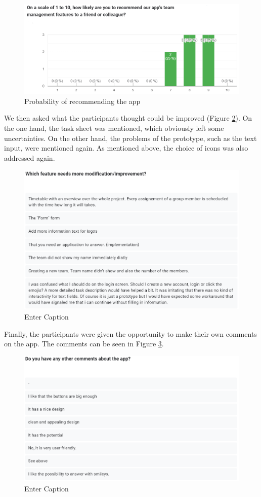 \documentclass[11pt]{article}
\begin{document}
\begin{figure}[h!]
    \centering
    \includegraphics[width=0.9\linewidth]{figures/recommend.PNG}
    \caption{Probability of recommending the app}
    \label{fig:recommend}
\end{figure}
We then asked what the participants thought could be improved (Figure \ref{fig:comment improvement}). On the one hand, the task sheet was mentioned, which obviously left some uncertainties. On the other hand, the problems of the prototype, such as the text input, were mentioned again. As mentioned above, the choice of icons was also addressed again.
\begin{figure}[h!]
    \centering
    \includegraphics[width=0.9\linewidth]{figures/comments imrpovement needed.PNG}
    \caption{Enter Caption}
    \label{fig:comment improvement}
\end{figure}

Finally, the participants were given the opportunity to make their own comments on the app. The comments can be seen in Figure \ref{fig:general comments}.
\begin{figure}[h!]
    \centering
    \includegraphics[width=0.9\linewidth]{figures/general comments.PNG}
    \caption{Enter Caption}
    \label{fig:general comments}
\end{figure}
\end{document}
